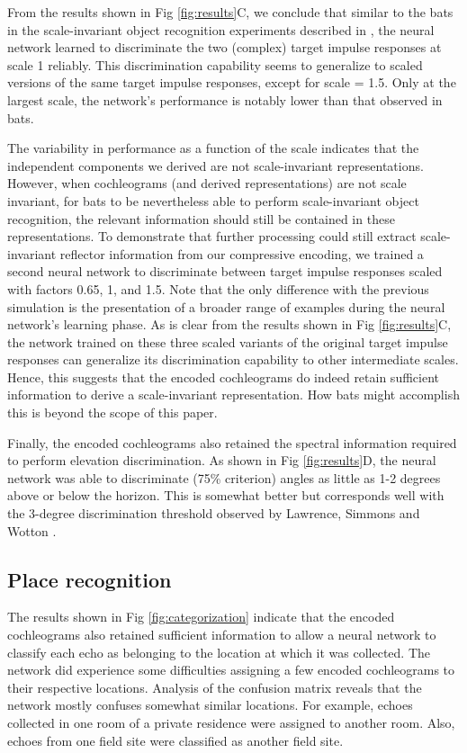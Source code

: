 \documentclass[10pt,letterpaper]{article}
\begin{document}
From the results shown in Fig \ref{fig:results}C, we conclude that similar to the bats in the scale-invariant object recognition experiments described in \cite{Firzlaff2007}, the neural network learned to discriminate the two (complex) target impulse responses at scale 1 reliably. This discrimination capability seems to generalize to scaled versions of the same target impulse responses, except for scale = 1.5. Only at the largest scale, the network's performance is notably lower than that observed in bats.

The variability in performance as a function of the scale indicates that the independent components we derived are not scale-invariant representations. However, when cochleograms (and derived representations) are not scale invariant, for bats to be nevertheless able to perform scale-invariant object recognition, the relevant information should still be contained in these representations. To demonstrate that further processing could still extract scale-invariant reflector information from our compressive encoding, we trained a second neural network to discriminate between target impulse responses scaled with factors 0.65, 1, and 1.5. Note that the only difference with the previous simulation is the presentation of a broader range of examples during the neural network's learning phase. As is clear from the results shown in Fig \ref{fig:results}C, the network trained on these three scaled variants of the original target impulse responses can generalize its discrimination capability to other intermediate scales. Hence, this suggests that the encoded cochleograms do indeed retain sufficient information to derive a scale-invariant representation. How bats might accomplish this is beyond the scope of this paper.

Finally, the encoded cochleograms also retained the spectral information required to perform elevation discrimination. As shown in Fig \ref{fig:results}D, the neural network was able to discriminate (75\% criterion) angles as little as 1-2 degrees above or below the horizon. This is somewhat better but corresponds well with the 3-degree discrimination threshold observed by Lawrence, Simmons and Wotton \cite{Lawrence1982,Wotton2000}.

\subsection*{Place recognition}

The results shown in Fig \ref{fig:categorization} indicate that the encoded cochleograms also retained sufficient information to allow a neural network to classify each echo as belonging to the location at which it was collected. The network did experience some difficulties assigning a few encoded cochleograms to their respective locations. Analysis of the confusion matrix reveals that the network mostly confuses somewhat similar locations. For example, echoes collected in one room of a private residence were assigned to another room. Also, echoes from one field site were classified as another field site.
\end{document}
